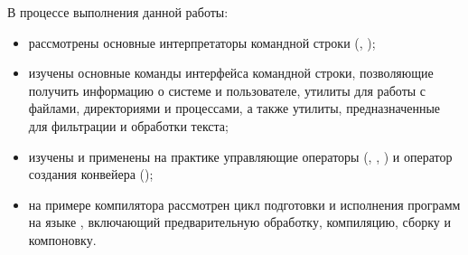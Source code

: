В процессе выполнения данной работы:
\begin{itemize}
	\item рассмотрены основные интерпретаторы командной строки (, );
	\item изучены основные команды интерфейса командной строки, позволяющие получить информацию о системе и пользователе, утилиты для работы с файлами, директориями и процессами, а также утилиты, предназначенные для фильтрации и обработки текста;
	\item изучены и применены на практике управляющие операторы (\code{\&}, \code{\&\&}, \code{||}) и оператор создания конвейера (\code{|});
	\item на примере компилятора  рассмотрен цикл подготовки и исполнения программ на языке , включающий предварительную обработку, компиляцию, сборку и компоновку.
\end{itemize}


